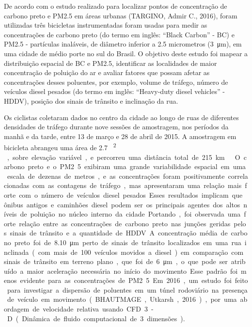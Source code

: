 De acordo com o estudo realizado para localizar pontos de concentração de carbono preto e PM2.5 em 
áreas urbanas (TARGINO, Admir C., 2016), foram utilizadas três bicicletas instrumentadas foram 
usadas para medir as concentrações de carbono preto (do termo em inglês: ``Black Carbon'' - BC) e 
PM2.5 - partículas inaláveis, de diâmetro inferior a 2.5 micrometros (\SI{3}{ \micro\meter }), em 
uma cidade de médio porte no sul do Brasil. O objetivo deste estudo foi mapear a distribuição 
espacial de BC e PM2.5, identificar as localidades de maior concentração de poluição do ar e avaliar 
fatores que possam afetar as concentrações desses poluentes, por exemplo, volume de tráfego, número 
de veículos diesel pesados (do termo em inglês: ``Heavy-duty diesel vehicles'' - HDDV), posição dos 
sinais de trânsito e inclinação da rua. 

Os ciclistas coletaram dados no centro da cidade ao longo de ruas de diferentes densidades de 
tráfego durante nove sessões de amostragem, nos períodos da manhã e da tarde, entre 13 de março e 28 
de abril de 2015. A amostragem em bicicleta abrangeu uma área de 
\SI{2.7}{ \kilo\meter\textsuperscript{2} }, sobre elevação variável, e percorreu uma distância total 
de \SI{215}{ \kilo\meter\ }. O carbono preto e o PM2.5 exibiram uma grande variabilidade espacial em 
uma escala de dezenas de metros, e as concentrações foram positivamente correlacionadas com as 
contagens de tráfego, mas apresentaram uma relação mais forte com o número de veículos diesel pesados. 

Esses resultados implicam que ônibus antigos e caminhões diesel podem ser os principais agentes dos 
altos níveis de poluição no núcleo interno da cidade. Portando, foi observada uma forte relação 
entre as concentrações de carbono preto nas junções geridas pelos sinais de trânsito e a quantidade 
de HDDV. A concentração média de carbono preto foi de \SI{8.10}{ \micro\meter } perto de sinais de 
trânsito localizados em uma rua inclinada (com mais de 100 veículos movidos a diesel) em comparação 
com sinais de trânsito em terreno plano, que foi de \SI{6}{ \micro\meter }, o que pode ser atribuído 
a maior aceleração necessária no início do movimento. Esse padrão foi menos evidente para as 
concentrações de PM2.5.

Em 2016, um estudo foi feito para investigar a dispersão de poluentes em um túnel rodoviário na 
presença de veículo em movimento (BHAUTMAGE, Utkarsh, 2016), por uma abordagem de velocidade relativa 
usando CFD 3-D (Dinâmica de fluido computacional de 3 dimensões). 

